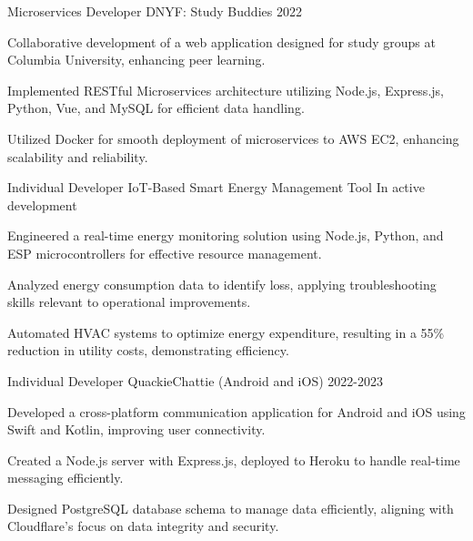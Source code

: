 
\begin{cventries}

  \cventry
    {Microservices Developer} %
    {DNYF: Study Buddies} %
    {} %
    {2022} %
    {
      \begin{cvitems} %
      \item {Collaborative development of a web application designed for study groups at Columbia University, enhancing peer learning.}
    \item {Implemented RESTful Microservices architecture utilizing Node.js, Express.js, Python, Vue, and MySQL for efficient data handling.}
    \item {Utilized Docker for smooth deployment of microservices to AWS EC2, enhancing scalability and reliability.}
      \end{cvitems}
    }

  \cventry
    {Individual Developer} %
    {IoT-Based Smart Energy Management Tool} %
    {} %
    {In active development} %
    {
      \begin{cvitems} %
      \item {Engineered a real-time energy monitoring solution using Node.js, Python, and ESP microcontrollers for effective resource management.}
    \item {Analyzed energy consumption data to identify loss, applying troubleshooting skills relevant to operational improvements.}
    \item {Automated HVAC systems to optimize energy expenditure, resulting in a 55\% reduction in utility costs, demonstrating efficiency.}
      \end{cvitems}
    }

  \cventry
    {Individual Developer} %
    {QuackieChattie (Android and iOS)} %
    {} %
    {2022-2023} %
    {
      \begin{cvitems} %
      \item {Developed a cross-platform communication application for Android and iOS using Swift and Kotlin, improving user connectivity.}
    \item {Created a Node.js server with Express.js, deployed to Heroku to handle real-time messaging efficiently.}
    \item {Designed PostgreSQL database schema to manage data efficiently, aligning with Cloudflare’s focus on data integrity and security.}
      \end{cvitems}
    }
\end{cventries}
